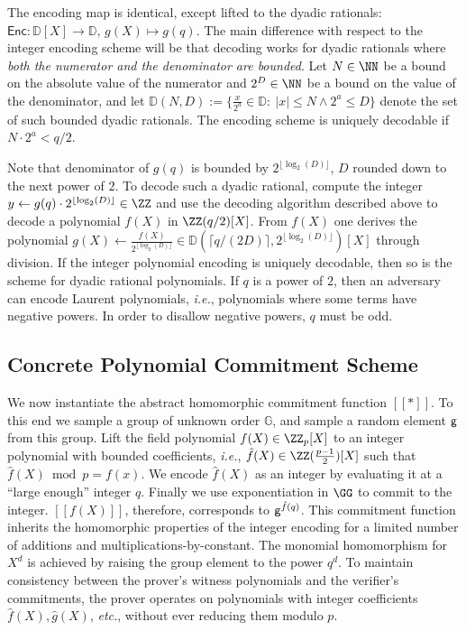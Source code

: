 The encoding map is identical, except lifted to the dyadic rationals: $\mathsf{Enc} : \mathbb{D}[X] \rightarrow \mathbb{D}, \, g(X) \mapsto g(q)$. The main difference with respect to the integer encoding scheme will be that decoding works for dyadic rationals where \emph{both the numerator and the denominator are bounded}. Let $N \in \NN$ be a bound on the absolute value of the numerator and $2^D\in \NN$ be a bound on the value of the denominator, and let $\mathbb{D}(N, D) :=\{\frac{x}{2^a} \in \mathbb{D} : \ |x|\leq N \wedge 2^a \leq D\}$ denote the set of such bounded dyadic rationals. The encoding scheme is uniquely decodable if $N \cdot 2^a < q/2$.
 
Note that denominator of $g(q)$ is bounded by $2^{\lfloor\log_2(D)\rfloor}$, $D$ rounded down to the next power of $2$. To decode such a dyadic rational, compute the integer $y \gets g(q) \cdot 2^{\lfloor\log_2(D)\rfloor}\in \ZZ$  and use the decoding algorithm described above to decode a polynomial $f(X)$ in $\ZZ(q/2)[X]$. From $f(X)$ one derives the polynomial  $g(X) \gets \frac{f(X)}{2^{\lfloor\log_2(D)\rfloor}} \in \mathbb{D}(\lceil q/(2D)\rceil, 2^{\lfloor\log_2(D)\rfloor})[X]$ through division. If the integer polynomial encoding is uniquely decodable, then so is the scheme for dyadic rational polynomials. If $q$ is a power of $2$, then an adversary can encode Laurent polynomials, \emph{i.e.}, polynomials where some terms have negative powers. In order to disallow negative powers, $q$ must be odd.

\subsection{Concrete Polynomial Commitment Scheme}
\label{subsec:concretepoly}
We now instantiate the abstract homomorphic commitment function $[\![ * ]\!]$. To this end we sample a group of unknown order $\mathbb{G}$, and sample a random element $\mathsf{g}$ from this group. 
Lift the field polynomial $f(X)\in \ZZ_p[X]$ to an integer polynomial with bounded coefficients, \emph{i.e.}, $\hat{f}(X)\in \ZZ(\frac{p-1}{2})[X]$ such that $\hat{f}(X)\bmod p=f(x)$.
We encode $\hat{f}(X)$ as an integer by evaluating it at a ``large enough'' integer $q$. Finally we use exponentiation in $\GG$ to commit to the integer. $[\![f(X)]\!]$, therefore, corresponds to $\mathsf{g}^{\hat{f}(q)}$. This commitment function inherits the homomorphic properties of the integer encoding for a limited number of additions and multiplications-by-constant. The monomial homomorphism for $X^d$ is achieved by raising the group element to the power $q^{d}$. To maintain consistency between the prover's witness polynomials and the verifier's commitments, the prover operates on polynomials with integer coefficients  $\hat{f}(X), \hat{g}(X)$, \emph{etc.}, without ever reducing them modulo $p$.

